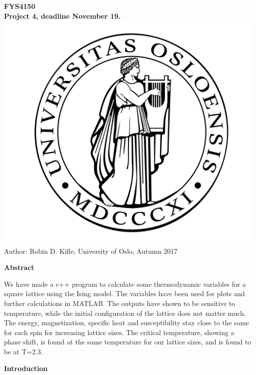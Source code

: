 \documentclass[10pt,a4paper]{article}
\begin{document}
\begin{center}
{\LARGE\bf
FYS4150\\
Project 4, deadline November 19.
}
 \includegraphics[scale=0.075]{uio.png}\\
Author: Robin D. Kifle,
University of Oslo, Autumn 2017

\vspace{3cm}
{\LARGE\bf
Abstract
}
\end{center}
We have made a c++ program to calculate some thermodynamic variables for a square lattice using the Ising model. The variables have been used for plots and further calculations in MATLAB. The outputs have shown to be sensitive to temperature, while the initial configuration of the lattice does not matter much. The energy, magnetization, specific heat and susceptibility stay close to the same for each spin for increasing lattice sizes. The critical temperature, showing a phase shift, is found at the same temperature for our lattice sizes, and is found to be at T=2.3.

\newpage

{\LARGE\bf
Introduction
}\\
\end{document}
